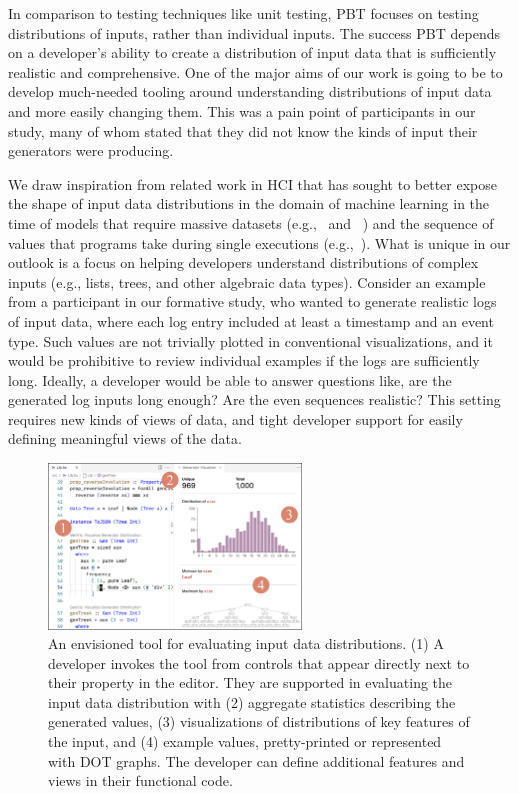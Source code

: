 %
In comparison to testing techniques like unit testing, PBT focuses on testing
distributions of inputs, rather than individual inputs. The success
PBT depends on a developer's ability to create a distribution
of input data that is sufficiently realistic and comprehensive. One of the major
aims of our work is going to be to develop much-needed tooling around
understanding distributions of input data and more easily changing them. This
was a pain point of participants in our study, many of whom stated that they did
not know the kinds of input their generators were producing.

We draw inspiration from related work in HCI that has sought to better expose
the shape of input data distributions in the domain of machine learning in the time of models
that require massive datasets (e.g.,~\cite{ref:hohman2019gamut} and
~\cite{ref:hohman2020understanding}) and the sequence of values that programs
take during single executions (e.g.,~\cite{ref:kang2017omnicode}). What is unique
in our outlook is a focus on helping developers understand distributions of
complex inputs (e.g., lists, trees, and other algebraic data types). Consider an
example from a participant in our formative study, who wanted to generate
realistic logs of input data, where each log entry included at least a timestamp
and an event type. Such values are not trivially plotted in conventional
visualizations, and it would be prohibitive to review individual examples if the
logs are sufficiently long. Ideally, a developer would be able to answer
questions like, are the generated log inputs long enough? Are the even sequences
realistic?  This setting requires new kinds of views of data, and tight
developer support for easily defining meaningful views of the data.

\begin{figure}
  \centering
  \includegraphics[width=0.6\textwidth]{assets/gen-vis.pdf}
  \caption{An envisioned tool for evaluating input data distributions.
  (1) A developer invokes the tool from controls that appear directly
  next to their property in the editor. They are supported in evaluating the
  input data distribution with (2) aggregate statistics describing the generated
  values, (3) visualizations of distributions of key features of the input, and (4)
  example values, pretty-printed or represented with DOT graphs. The developer can define additional
  features and views in their functional code.}\label{fig:gen-vis}
\end{figure}

